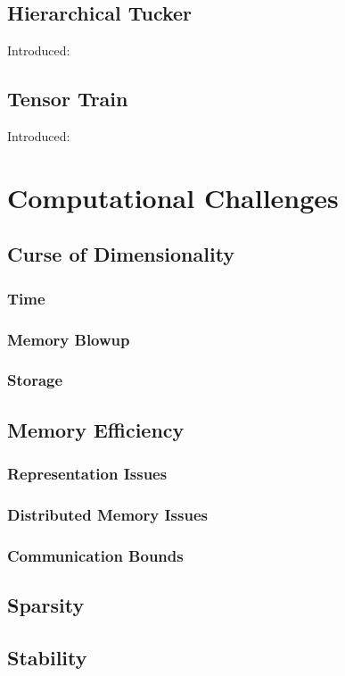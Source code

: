 \documentclass[10pt]{article}
\begin{document}
\subsection{Hierarchical Tucker}
Introduced:~\cite{Grasedyck:2010:HSV:1958286.1958311}
\subsection{Tensor Train}
Introduced:~\cite{Oseledets:2011:TD:2079141.2079149}
\section{Computational Challenges}
\subsection{Curse of Dimensionality}
\subsubsection{Time}
\subsubsection{Memory Blowup}
\subsubsection{Storage}
\subsection{Memory Efficiency}
\subsubsection{Representation Issues}
\subsubsection{Distributed Memory Issues}
\subsubsection{Communication Bounds}
\subsection{Sparsity}
\subsection{Stability}
\end{document}
